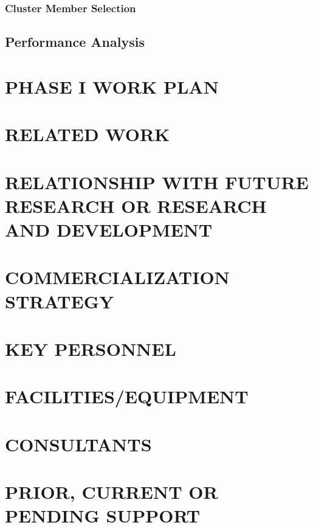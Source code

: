 \documentclass[letterpaper,11pt]{article}
\begin{document}
\subsubsection{Cluster Member Selection}
 
 

\subsection{Performance Analysis}


\section{PHASE I WORK PLAN}

\section{RELATED WORK}

\section{RELATIONSHIP WITH FUTURE RESEARCH OR RESEARCH AND DEVELOPMENT}

\section{COMMERCIALIZATION STRATEGY}

\section{KEY PERSONNEL}

\section{FACILITIES/EQUIPMENT}

\section{CONSULTANTS}

\section{PRIOR, CURRENT OR PENDING SUPPORT}



\end{document}
